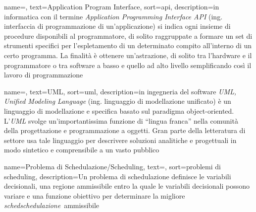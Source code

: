 
\renewcommand{\acronymname}{Acronimi e abbreviazioni}




\renewcommand{\glossaryname}{Glossario}

{
    name=,
    text=Application Program Interface,
    sort=api,
    description={in informatica con il termine \emph{Application Programming Interface API} (ing. interfaccia di programmazione di un'applicazione) si indica ogni insieme di procedure disponibili al programmatore, di solito raggruppate a formare un set di strumenti specifici per l'espletamento di un determinato compito all'interno di un certo programma. La finalità è ottenere un'astrazione, di solito tra l'hardware e il programmatore o tra software a basso e quello ad alto livello semplificando così il lavoro di programmazione}
}

{
    name=,
    text=UML,
    sort=uml,
    description={in ingegneria del software \emph{UML, Unified Modeling Language} (ing. linguaggio di modellazione unificato) è un linguaggio di modellazione e specifica basato sul paradigma object-oriented. L'\emph{UML} svolge un'importantissima funzione di ``lingua franca'' nella comunità della progettazione e programmazione a oggetti. Gran parte della letteratura di settore usa tale linguaggio per descrivere soluzioni analitiche e progettuali in modo sintetico e comprensibile a un vasto pubblico}
}

{
    name=Problema di Schedulazione/Scheduling,
    text=,
    sort=problemi di scheduling,
    description={Un problema di schedulazione definisce le variabili decisionali, una regione ammissibile entro la quale le variabili decisionali possono variare e una funzione obiettivo per determinare la migliore \emph{\gls{sched}schedulazione}\glsfirstoccur\ ammissibile}
}

